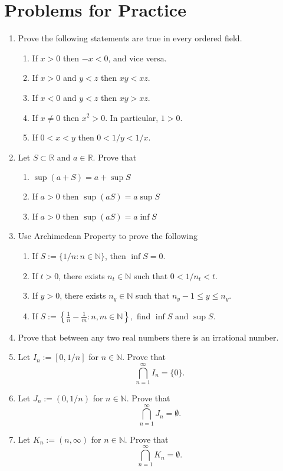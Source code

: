 \documentclass[12pt]{article}
\begin{document}
\newpage

\section{Problems for Practice}

\begin{enumerate}

    \item Prove the following statements are true in every ordered field.

    \begin{enumerate}
        \item If $x > 0$ then $-x < 0$, and vice versa.
        \item If $x > 0$ and $y < z$ then $xy < xz$.
        \item If $x < 0$ and $y < z$ then $xy > xz$.
        \item If $x \neq 0$ then $x^2 > 0$. In particular, $1 > 0$.
        \item If $0 < x < y$ then $0 < 1/y < 1/x$.
    \end{enumerate}

    \item Let $S\subset\mathbb{R}$ and $a\in\mathbb{R}$. Prove that
    \begin{enumerate}
        \item $\sup (a+S)=a+\sup S$
        \item If $a>0$ then $\sup (aS)=a\sup S$
        \item If $a>0$ then $\sup (aS)=a\inf S$
    \end{enumerate}
    \item Use Archimedean Property to prove the following
    \begin{enumerate}
        \item If $S := \{1/n : n \in \mathbb{N}\}$, then $\inf S = 0$.
        \item If $t > 0$, there exists $n_t \in \mathbb{N}$ such that $0 < 1/n_t < t$.
        \item If $y > 0$, there exists $n_y \in \mathbb{N}$ such that $n_y - 1 \leq y \leq n_y$.
        \item If \( S := \left\{ \frac{1}{n} - \frac{1}{m} : n, m \in \mathbb{N} \right\}, \) find \( \inf S \) and \( \sup S \).
    \end{enumerate}
    \item Prove that between any two real numbers there is an irrational number.
    \item Let \( I_n := [0, 1/n] \) for \( n \in \mathbb{N} \). Prove that
    \[
    \bigcap_{n=1}^{\infty} I_n = \{0\}.
    \]

    \item Let \( J_n := (0, 1/n) \) for \( n \in \mathbb{N} \). Prove that
    \[
    \bigcap_{n=1}^{\infty} J_n = \emptyset.
    \]

    \item Let \( K_n := (n, \infty) \) for \( n \in \mathbb{N} \). Prove that
    \[
    \bigcap_{n=1}^{\infty} K_n = \emptyset.
    \]

\end{enumerate}
\end{document}

